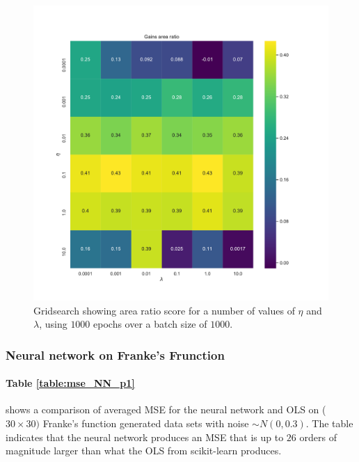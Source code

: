 \documentclass[%
oneside,                 %
final,                   %
10pt]{article}
\begin{document}
\begin{figure}[!h]
        \centering 
         \includegraphics[scale=0.5]{../Results/CC_NN_gridsearch/gridsearch_NN_area.pdf} 
        \caption{Gridsearch showing area ratio score for a number of values of $\eta$ and $\lambda$, using $1000$ epochs over a batch size of $1000$. }
        \label{fig:NN1_grid_eta}   
\end{figure}  

\subsubsection{Neural network on Franke's Frunction}
\paragraph{Table \ref{table:mse_NN_p1}} shows a comparison of averaged MSE for the neural network and OLS on ($30 \times 30)$ Franke's function generated data sets with noise $\sim N(0,0.3)$. The table indicates that the neural network produces an MSE that is up to $26$ orders of magnitude larger than what the OLS from scikit-learn produces.
\end{document}
